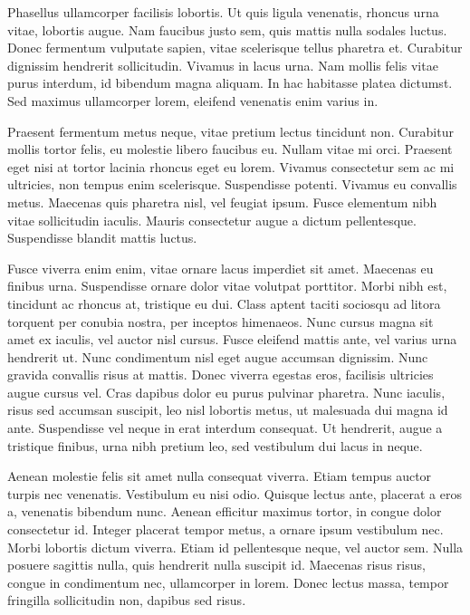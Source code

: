 Phasellus ullamcorper facilisis lobortis. Ut quis ligula venenatis, rhoncus urna vitae, lobortis augue. Nam faucibus justo sem, quis mattis nulla sodales luctus. Donec fermentum vulputate sapien, vitae scelerisque tellus pharetra et. Curabitur dignissim hendrerit sollicitudin. Vivamus in lacus urna. Nam mollis felis vitae purus interdum, id bibendum magna aliquam. In hac habitasse platea dictumst. Sed maximus ullamcorper lorem, eleifend venenatis enim varius in.

Praesent fermentum metus neque, vitae pretium lectus tincidunt non. Curabitur mollis tortor felis, eu molestie libero faucibus eu. Nullam vitae mi orci. Praesent eget nisi at tortor lacinia rhoncus eget eu lorem. Vivamus consectetur sem ac mi ultricies, non tempus enim scelerisque. Suspendisse potenti. Vivamus eu convallis metus. Maecenas quis pharetra nisl, vel feugiat ipsum. Fusce elementum nibh vitae sollicitudin iaculis. Mauris consectetur augue a dictum pellentesque. Suspendisse blandit mattis luctus.

Fusce viverra enim enim, vitae ornare lacus imperdiet sit amet. Maecenas eu finibus urna. Suspendisse ornare dolor vitae volutpat porttitor. Morbi nibh est, tincidunt ac rhoncus at, tristique eu dui. Class aptent taciti sociosqu ad litora torquent per conubia nostra, per inceptos himenaeos. Nunc cursus magna sit amet ex iaculis, vel auctor nisl cursus. Fusce eleifend mattis ante, vel varius urna hendrerit ut. Nunc condimentum nisl eget augue accumsan dignissim. Nunc gravida convallis risus at mattis. Donec viverra egestas eros, facilisis ultricies augue cursus vel. Cras dapibus dolor eu purus pulvinar pharetra. Nunc iaculis, risus sed accumsan suscipit, leo nisl lobortis metus, ut malesuada dui magna id ante. Suspendisse vel neque in erat interdum consequat. Ut hendrerit, augue a tristique finibus, urna nibh pretium leo, sed vestibulum dui lacus in neque.

Aenean molestie felis sit amet nulla consequat viverra. Etiam tempus auctor turpis nec venenatis. Vestibulum eu nisi odio. Quisque lectus ante, placerat a eros a, venenatis bibendum nunc. Aenean efficitur maximus tortor, in congue dolor consectetur id. Integer placerat tempor metus, a ornare ipsum vestibulum nec. Morbi lobortis dictum viverra. Etiam id pellentesque neque, vel auctor sem. Nulla posuere sagittis nulla, quis hendrerit nulla suscipit id. Maecenas risus risus, congue in condimentum nec, ullamcorper in lorem. Donec lectus massa, tempor fringilla sollicitudin non, dapibus sed risus.

